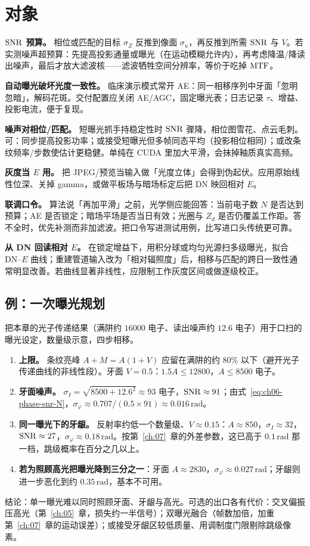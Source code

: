 \section{对象}
\label{sec:ch05-object}

\textbf{$\mathrm{SNR}$ 预算。} 相位或匹配的目标 $\sigma_Z$ 反推到像面 $\sigma_u$，再反推到所需 $\mathrm{SNR}$ 与 $V$。若实测噪声超预算：先提高投影通量或曝光（在运动模糊允许内），再考虑降温/降读出噪声，最后才放大滤波核——滤波牺牲空间分辨率，等价于吃掉 $\mathrm{MTF}$。

\textbf{自动曝光破坏光度一致性。} 临床演示模式常开 AE：同一相移序列中牙面「忽明忽暗」，解码花斑。交付配置应关闭 AE/AGC，固定曝光表；日志记录 $\tau$、增益、投影电流，便于复现。

\textbf{噪声对相位/匹配。} 短曝光抓手持稳定性时 $\mathrm{SNR}$ 骤降，相位图雪花、点云毛刺。可：同步提高投影功率；或接受短曝光但多帧同态平均（投影相位相同）；或改条纹频率/步数使估计更稳健。单纯在 CUDA 里加大平滑，会抹掉釉质真实高频。

\textbf{灰度当 $E$ 用。} 把 JPEG/预览当输入做「光度立体」会得到伪起伏。应用原始线性位深、关掉 gamma，或做平板场与暗场标定后把 DN 映回相对 $E$。


\textbf{联调口令。} 算法说「再加平滑」之前，光学侧应能回答：当前电子数 $N$ 是否达到预算；AE 是否锁定；暗场平场是否当日有效；光圈与 $Z_d$ 是否仍覆盖工作距。答不全时，优先补测而非加滤波。把口令写进测试用例，比写进口头传统更可靠。

\textbf{从 DN 回读相对 $E$。} 在锁定增益下，用积分球或均匀光源扫多级曝光，拟合 DN–$E$ 曲线；重建管道输入改为「相对辐照度」后，相移与匹配的跨日一致性通常明显改善。若曲线显著非线性，应限制工作灰度区间或做逐级校正。

\subsection{例：一次曝光规划}

把本章的光子传递结果（满阱约 $16000$ 电子、读出噪声约 $12.6$ 电子）用于口扫的曝光设定，数量级示意，四步相移。
\begin{enumerate}
  \item \textbf{上限。} 条纹亮峰 $A+M=A(1+V)$ 应留在满阱的约 $80\%$ 以下（避开光子传递曲线的非线性段）。牙面 $V=0.5$：$1.5A\le12800$，$A\le8500$ 电子。
  \item \textbf{牙面噪声。} $\sigma_I=\sqrt{8500+12.6^2}\approx93$ 电子，$\mathrm{SNR}\approx91$；由式~\eqref{eq:ch06-phase-snr-N}，$\sigma_\varphi\approx0.707/(0.5\times91)\approx0.016\,\mathrm{rad}$。
  \item \textbf{同一曝光下的牙龈。} 反射率约低一个数量级、$V\approx0.15$：$A\approx850$，$\sigma_I\approx32$，$\mathrm{SNR}\approx27$，$\sigma_\varphi\approx0.18\,\mathrm{rad}$。按第~\ref{ch:07}~章的外差参数，这已高于 $0.1\,\mathrm{rad}$ 那一档，跳级概率在百分之几以上。
  \item \textbf{若为照顾高光把曝光降到三分之一}：牙面 $A\approx2830$，$\sigma_\varphi\approx0.027\,\mathrm{rad}$；牙龈则进一步恶化到约 $0.35\,\mathrm{rad}$，基本不可用。
\end{enumerate}
结论：单一曝光难以同时照顾牙面、牙龈与高光。可选的出口各有代价：交叉偏振压高光（第~\ref{ch:05}~章，损失约一半信号）；双曝光融合（帧数加倍，加重第~\ref{ch:07}~章的运动误差）；或接受牙龈区较低质量、用调制度门限剔除跳级像素。


